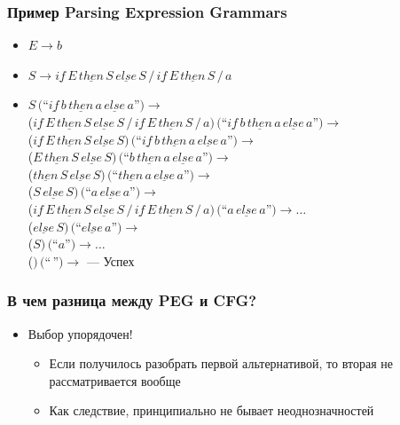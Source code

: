 \documentclass{beamer}
\begin{document}
\begin{frame}[fragile]
  \transwipe[direction=90]
  \frametitle{Пример Parsing Expression Grammars}
  \begin{itemize}
    \item $E \rightarrow b $
    \item $S \rightarrow \underline{if} \, E \, \underline{then} \, S \, \underline{else} \, S \, / \, \underline{if} \, E \, \underline{then} \, S \, / \, a$    
  \end{itemize}
  
  \begin{itemize}
    \item $S \, ($``$\underline{if} \, b \, \underline{then} \, a \, \underline{else} \, a  $''$) \rightarrow $ \\
     ($\underline{if} \, E \, \underline{then} \, S \, \underline{else} \, S \, / \, \underline{if} \, E \, \underline{then} \, S \, / \, a) \, ($``$\underline{if} \, b \, \underline{then} \, a \, \underline{else} \, a$''$) \rightarrow $ \\  
     ($\underline{if} \, E \, \underline{then} \, S \, \underline{else} \, S) \, ($``$\underline{if} \, b \, \underline{then} \, a \, \underline{else} \, a$''$) \rightarrow $ \\
     ($E \, \underline{then} \, S \, \underline{else} \, S) \, ($``$b \, \underline{then} \, a \, \underline{else} \, a$''$) \rightarrow $ \\ 
     ($\underline{then} \, S \, \underline{else} \, S) \, ($``$\underline{then} \, a \, \underline{else} \, a$''$) \rightarrow $ \\ 
     ($S \, \underline{else} \, S) \, ($``$a \, \underline{else} \, a$''$) \rightarrow $ \\   
     ($\underline{if} \, E \, \underline{then} \, S \, \underline{else} \, S \, / \, \underline{if} \, E \, \underline{then} \, S \, / \, a) \, ($``$a \, \underline{else} \, a$''$) \rightarrow \dots $ \\   
     ($\underline{else} \, S) \, ($``$\underline{else} \, a$''$) \rightarrow $ \\   
     ($S) \, ($``$a$''$) \rightarrow \dots $ \\
     ($) \, ($``$\,$''$) \rightarrow $  --- Успех        
  \end{itemize}
\end{frame}

\begin{frame}[fragile]
  \transwipe[direction=90]
  \frametitle{В чем разница между PEG и CFG?}
  \begin{itemize}
    \item Выбор упорядочен!
    \begin{itemize}
      \item Если получилось разобрать первой альтернативой, то вторая не рассматривается вообще
      \item Как следствие, принципиально не бывает неоднозначностей 
    \end{itemize}
  \end{itemize}
\end{frame}
\end{document}
